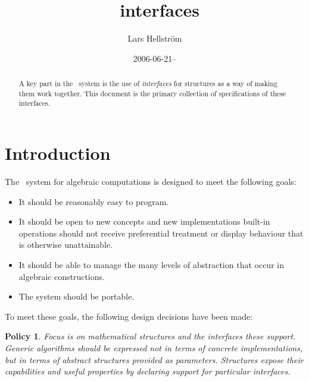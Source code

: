 \documentclass{mtmtcl}
\theoremstyle{plain}
\newtheorem{policy}{Policy}
\theoremstyle{remark}
\begin{document}
\title{\mtl~interfaces}
\author{Lars Hellstr\"om}
\date{2006-06-21--}
\maketitle


\begin{abstract}
  A key part in the \mtl\ system is the use of \emph{interfaces} 
  for structures as a way of making them work together. This 
  document is the primary collection of specifications of these 
  interfaces.
\end{abstract}

\tableofcontents


\section{Introduction}

The \mtl\ system for algebraic computations is designed to meet the 
following goals:
\begin{itemize}
  \item
    It should be reasonably easy to program. 
    \iffalse
    and in particular not 
    constantly burden the mathematician's mind with issues of how 
    data is being stored.
    \fi
  \item
    It should be open to new concepts and new implementations\Dash 
    built-in operations should not receive preferential treatment or 
    display behaviour that is otherwise unattainable.
  \item
    It should be able to manage the many levels of abstraction that 
    occur in algebraic constructions.
  \item
    The system should be portable.
\end{itemize}
To meet these goals, the following design decisions have been made:

\begin{policy} \label{Pol:Strukturer}
  Focus is on mathematical \emph{structures} and the \emph{interfaces} 
  these support. Generic algorithms should be expressed not in terms 
  of concrete implementations, but in terms of abstract structures 
  provided as parameters. Structures expose their capabilities and 
  useful properties by declaring support for particular interfaces.
\end{policy}
\end{document}
